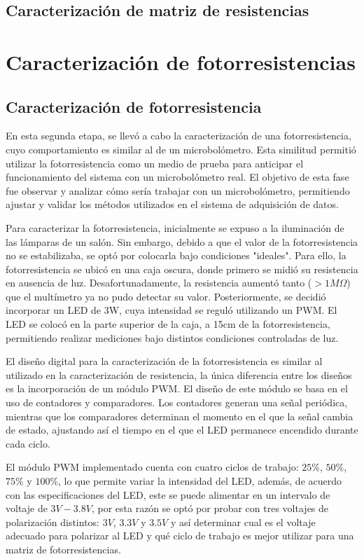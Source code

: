 \subsection{Caracterización de matriz de resistencias}


\section{Caracterización de fotorresistencias}
\subsection{Caracterización de fotorresistencia}
En esta segunda etapa, se llevó a cabo la caracterización de una fotorresistencia, cuyo comportamiento es similar al de un microbolómetro. Esta similitud permitió utilizar la fotorresistencia como un medio de prueba para anticipar el funcionamiento del sistema con un microbolómetro real. El objetivo de esta fase fue observar y analizar cómo sería trabajar con un microbolómetro, permitiendo ajustar y validar los métodos utilizados en el sistema de adquisición de datos.


Para caracterizar la fotorresistencia, inicialmente se expuso a la iluminación de las lámparas de un salón. Sin embargo, debido a que el valor de la fotorresistencia no se estabilizaba, se optó por colocarla bajo condiciones "ideales". Para ello, la fotorresistencia se ubicó en una caja oscura, donde primero se midió su resistencia en ausencia de luz. Desafortunadamente, la resistencia aumentó tanto ($> 1M\Omega$) que el multímetro ya no pudo detectar su valor. Posteriormente, se decidió incorporar un LED de 3W, cuya intensidad se reguló utilizando un PWM. El LED se colocó en la parte superior de la caja, a 15cm de la fotorresistencia, permitiendo realizar mediciones bajo distintos condiciones controladas de luz.


El diseño digital para la caracterización de la fotorresistencia es similar al utilizado en la caracterización de resistencia, la única diferencia entre los diseños es la incorporación de un módulo PWM. El diseño de este módulo se basa en el uso de contadores y comparadores. Los contadores generan una señal periódica, mientras que los comparadores determinan el momento en el que la señal cambia de estado, ajustando así el tiempo en el que el LED permanece encendido durante cada ciclo.


El módulo PWM implementado cuenta con cuatro ciclos de trabajo: $25\%$, $50\%$, $75\%$ y $100\%$, lo que permite variar la intensidad del LED, además, de acuerdo con las especificaciones del LED, este se puede alimentar en un intervalo de voltaje de $3V - 3.8V$, por esta razón se optó por probar con tres voltajes de polarización distintos: $3V$, $3.3V$ y $3.5V$ y así determinar cual es el voltaje adecuado para polarizar al LED y qué ciclo de trabajo es mejor utilizar para una matriz de fotorresistencias. 


